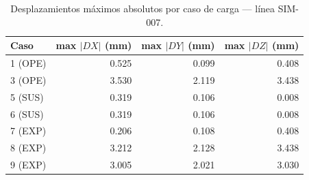 \begin{table}[htbp]
  \centering
  \small
  \caption{Desplazamientos máximos absolutos por caso de carga — línea SIM-007.}
  \label{tab:desplaz-max}
  \begin{tabular}{lrrr}
    \toprule
    Caso & max $|DX|$ (\si{mm}) & max $|DY|$ (\si{mm}) & max $|DZ|$ (\si{mm}) \\
    \midrule
    1 (OPE) & 0.525 & 0.099 & 0.408 \\
    3 (OPE) & 3.530 & 2.119 & 3.438 \\
    5 (SUS) & 0.319 & 0.106 & 0.008 \\
    6 (SUS) & 0.319 & 0.106 & 0.008 \\
    7 (EXP) & 0.206 & 0.108 & 0.408 \\
    8 (EXP) & 3.212 & 2.128 & 3.438 \\
    9 (EXP) & 3.005 & 2.021 & 3.030 \\
    \bottomrule
  \end{tabular}
\end{table}
